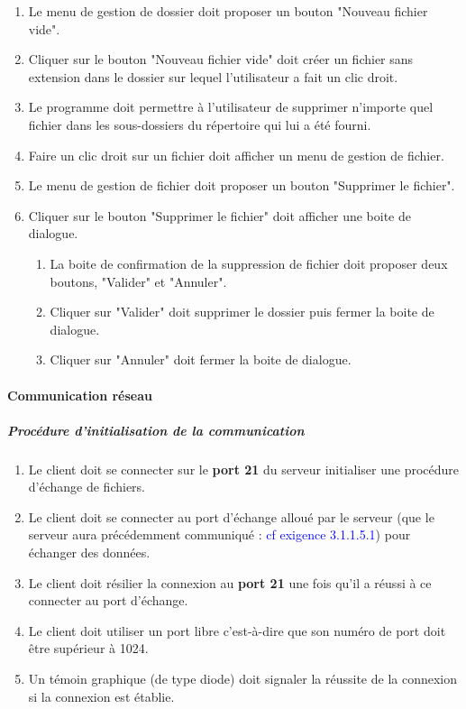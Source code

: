 \documentclass[10pt,a4paper]{report}
\begin{document}
\begin{enumerate}
		\item Le menu de gestion de dossier doit proposer un bouton "Nouveau fichier vide".
		\item Cliquer sur le bouton "Nouveau fichier vide" doit créer un fichier sans extension dans le dossier sur lequel l'utilisateur a fait un clic droit.
		\item Le programme doit permettre à l'utilisateur de supprimer n'importe quel fichier dans les sous-dossiers du répertoire qui lui a été fourni.
		\item Faire un clic droit sur un fichier doit afficher un menu de gestion de fichier.
		\item Le menu de gestion de fichier doit proposer un bouton "Supprimer le fichier".
		\item Cliquer sur le bouton "Supprimer le fichier" doit afficher une boite de dialogue.
		\begin{enumerate}[label=\arabic*.]
			\item La boite de confirmation de la suppression de fichier doit proposer deux boutons, "Valider" et "Annuler".
			\item Cliquer sur "Valider" doit supprimer le dossier puis fermer la boite de dialogue.
			\item Cliquer sur "Annuler" doit fermer la boite de dialogue.
		\end{enumerate}
	\end{enumerate}
	
\paragraph{Communication réseau}

	\subparagraph{Procédure d'initialisation de la communication}

		\begin{enumerate}

			\item Le client doit se connecter sur le \textbf{port 21} du serveur initialiser une procédure d'échange de fichiers.
			\item Le client doit se connecter au port d'échange alloué par le serveur (que le serveur aura précédemment communiqué : \textcolor{blue}{cf exigence 3.1.1.5.1}) pour échanger des données.
			\item Le client doit résilier la connexion au \textbf{port 21} une fois qu'il a réussi à ce connecter au port d'échange.
			\item Le client doit utiliser un port libre c'est-à-dire que son numéro de port doit être supérieur à 1024.
			\item Un témoin graphique (de type diode) doit signaler la réussite de la connexion si la connexion est établie. 
			\end{enumerate}
\end{document}
